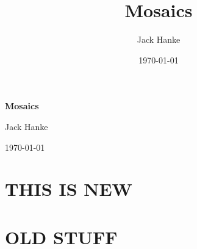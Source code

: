 \documentclass[12pt]{article}
\title{Mosaics}
\author{Jack Hanke}
\date{\today}
\theoremstyle{plain}
\theoremstyle{definition}
\theoremstyle{remark}
\theoremstyle{definition}
\begin{document}
\begin{center}
    \Large
    \textbf{Mosaics}
    
    \vspace{0.4cm}
    \large
    
    Jack Hanke   
    \vspace{0.4cm}
    
    \today
    \vspace{0.4cm}    
\end{center}

\section{THIS IS NEW}

\section{OLD STUFF}
\end{document}
